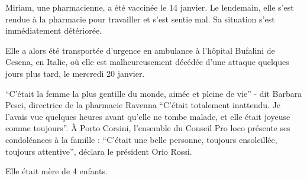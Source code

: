 Miriam, une pharmacienne, a été vaccinée le 14 janvier. Le lendemain, elle s'est
rendue à la pharmacie pour travailler et s'est sentie mal. Sa situation s'est
immédiatement détériorée.

Elle a alors été transportée d'urgence en ambulance à l'hôpital Bufalini de
Cesena, en Italie, où elle est malheureusement décédée d'une attaque quelques
jours plus tard, le mercredi 20 janvier.

“C'était la femme la plus gentille du monde, aimée et pleine de vie” - dit
Barbara Pesci, directrice de la pharmacie Ravenna “C'était totalement
inattendu. Je l'avais vue quelques heures avant qu'elle ne tombe malade, et elle
était joyeuse comme toujours”. À Porto Corsini, l'ensemble du Conseil Pro loco
présente ses condoléances à la famille : “C'était une belle personne, toujours
ensoleillée, toujours attentive”, déclara le président Orio Rossi.

Elle était mère de 4 enfants.


